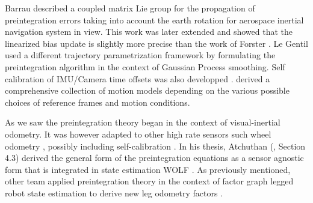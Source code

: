 Barrau \cite{barrau2020mathematical} described a coupled matrix Lie group for the propagation of preintegration errors taking into account the earth rotation for aerospace
inertial navigation system in view. This work was later extended \cite{brossard2021associating} and showed that the linearized bias update is slightly more precise than 
the work of Forster \cite{forster2017-TRO}. Le Gentil \cite{le2020gaussian} used a different trajectory parametrization framework by formulating the preintegration algorithm 
in the context of Gaussian Process smoothing. Self calibration of IMU/Camera time offsets was also developped \cite{yang2020analytic}. 
\cite{luo2021unified} derived a comprehensive collection of motion models depending on the various possible choices of reference frames and motion conditions. 

As we saw the preintegration theory began in the context of visual-inertial odometry. It was however adapted to other high rate sensors such wheel odometry \cite{quan2019tightly}, 
possibly including self-calibration \cite{deray-19-selfcalib}. In his thesis, Atchuthan (\cite{atchuthan-18-thesis}, Section 4.3) derived the general form of the preintegration 
equations as a sensor agnostic form that is integrated in state estimation WOLF \cite{sola2021wolf}. As previously mentioned, other team applied preintegration theory in the 
context of factor graph legged robot state estimation to derive new leg odometry factors \cite{hartley2018legged, wisth2019robust, wisth2020preintegrated}.